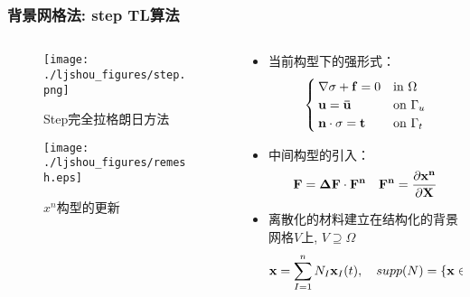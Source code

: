\documentclass[mathserif]{beamer}
\begin{document}
\begin{CJK}{UTF8}{gkai}
		\begin{frame}
			\frametitle{背景网格法: step TL算法}
			\begin{columns}
    			\begin{column}[pos]{0.4\textwidth}
    				\begin{figure}
    					\centering
    					\texttt{[image: ./ljshou\_figures/step.png]}
    					\label{fig:1}
    					\caption{Step完全拉格朗日方法}
    			    \end{figure}
    			    \begin{figure}
    					\centering
    					\texttt{[image: ./ljshou\_figures/remesh.eps]}
    					\label{fig:2}
    					\caption{$x^n$构型的更新}
    			    \end{figure}
    			\end{column}
    			
    			\begin{column}[pos]{0.6\textwidth}
    			    \footnotesize
    			    \begin{itemize}
    			    \item 当前构型下的强形式：
            			\begin{equation*}
            				\begin{cases}
            					\nabla {\bf \sigma} + {\bf f} = 0& \text{in }\Omega\\
            					{\bf u=\bar{u}}& \text{on }\Gamma_u\\
            					{\bf n}\cdot{\bf \sigma} = {\bf t}& \text{on }\Gamma_t
            				\end{cases}
            			\end{equation*}
            		\item 中间构型的引入：
            		    \begin{equation*}
            		        \bf{F=\Delta F \cdot{F^n} \quad  F^n=\frac{\partial{x^n}}{\partial{X}}}
            		    \end{equation*}
            		\item 离散化的材料建立在结构化的背景网格$V$上, $V \supseteq \Omega$
            			\begin{equation*}
            				{\bf x} = \sum_{I=1}^{n}N_I{\bf x}_I(t), \quad supp(N) = \{{\bf x} \in V \supseteq \Omega\}
            			\end{equation*}
    			    \end{itemize}
            			

\end{column}
\end{columns}
\end{frame}
\end{CJK}
\end{document}
